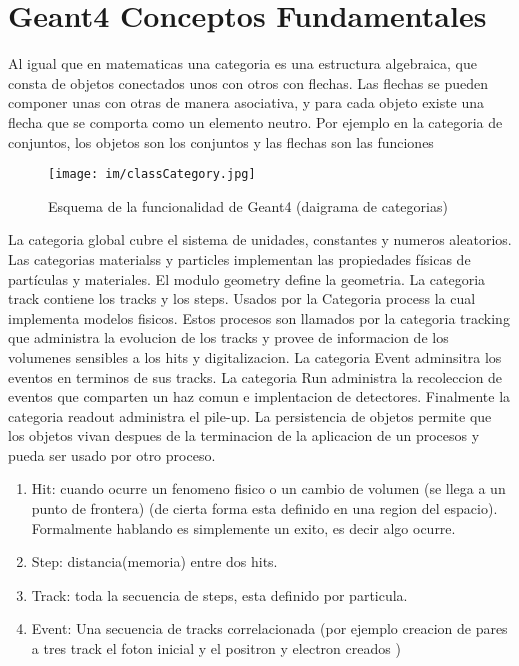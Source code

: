\documentclass[10pt,a4paper,oneside]{book}
\begin{document}
\section*{Geant4 Conceptos Fundamentales}
Al igual que en matematicas una categoria es una estructura
algebraica, que consta de objetos conectados unos con otros con
flechas. Las flechas se pueden componer unas con otras de manera
asociativa, y para cada objeto existe una flecha que se comporta como
un elemento neutro. Por ejemplo en la categoria de conjuntos, los
objetos son los conjuntos y las flechas son las funciones
\begin{figure}
  \centering
  \texttt{[image: im/classCategory.jpg]}
  \caption[]{Esquema de la funcionalidad de Geant4 (daigrama de categorias)}
\end{figure}

La categoria global cubre el sistema de unidades, constantes y numeros
aleatorios.  Las categorias materialss y particles implementan las
propiedades físicas de partículas y materiales. El modulo geometry
define la geometria. La categoria track contiene los tracks y los
steps. Usados por la Categoria process la cual implementa modelos
fisicos. Estos procesos son llamados por la categoria tracking que
administra la evolucion de los tracks y provee de informacion de los
volumenes sensibles a los hits y digitalizacion.  La categoria Event
adminsitra los eventos en terminos de sus tracks.  La categoria Run
administra la recoleccion de eventos que comparten un haz comun e
implentacion de detectores. Finalmente la categoria readout administra
el pile-up.  La persistencia de objetos permite que los objetos vivan
despues de la terminacion de la aplicacion de un procesos y pueda ser
usado por otro proceso.

\begin{enumerate}
\item Hit: cuando ocurre un fenomeno fisico o un cambio de volumen (se
  llega a un punto de frontera) (de cierta forma esta definido en una
  region del espacio). Formalmente hablando es simplemente un exito,
  es decir algo ocurre.
\item Step: distancia(memoria) entre dos hits.
\item Track: toda la secuencia de steps, esta definido por particula.
\item Event: Una secuencia de tracks correlacionada (por ejemplo
  creacion de pares a tres track el foton inicial y el positron y
  electron creados )
\end{enumerate}
\end{document}
